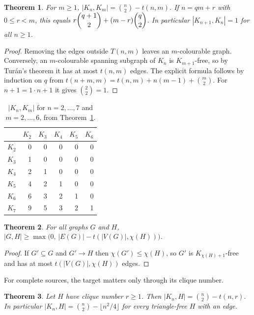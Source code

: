 \documentclass{article}
\newtheorem{theorem}{Theorem}[section]
\theoremstyle{definition}
\begin{document}
\begin{theorem}
\label{thm:KnKm}
For $m\ge1$, $\displaystyle|K_n,K_m| = \binom{n}{2} - t(n,m)$.
If $n=qm+r$ with $0\le r<m$, this equals
$r\dbinom{q+1}{2}+(m-r)\dbinom{q}{2}$.
In particular $|K_{n+1},K_n|=1$ for all $n\ge1$.
\end{theorem}

\begin{proof}
Removing the edges outside $T(n,m)$ leaves an $m$-colourable graph.  Conversely,
an $m$-colourable spanning subgraph of $K_n$ is $K_{m+1}$-free, so by Tur\'an's
theorem it has at most $t(n,m)$ edges.  The explicit formula follows by induction
on $q$ from $t(n+m,m)=t(n,m)+n(m-1)+\binom m2$.  For $n+1=1\cdot n+1$ it gives
$\binom22=1$.
\end{proof}

\begin{table}[ht]
\centering
\caption{$|K_n,K_m|$ for $n=2,\dots,7$ and $m=2,\dots,6$, from Theorem~\ref{thm:KnKm}.}
\label{tab:KnKm}
\begin{tabular}{c|rrrrr}
\toprule
       & $K_2$ & $K_3$ & $K_4$ & $K_5$ & $K_6$ \\
\midrule
$K_2$  & 0 & 0 & 0 & 0 & 0 \\
$K_3$  & 1 & 0 & 0 & 0 & 0 \\
$K_4$  & 2 & 1 & 0 & 0 & 0 \\
$K_5$  & 4 & 2 & 1 & 0 & 0 \\
$K_6$  & 6 & 3 & 2 & 1 & 0 \\
$K_7$  & 9 & 5 & 3 & 2 & 1 \\
\bottomrule
\end{tabular}
\end{table}

\begin{theorem}
\label{thm:lower_bound}
For all graphs $G$ and $H$,
$|G,H|\ge \max\bigl(0,\,|E(G)|-t(|V(G)|,\chi(H))\bigr)$.
\end{theorem}

\begin{proof}
If $G'\subseteq G$ and $G'\to H$ then $\chi(G')\le\chi(H)$, so $G'$ is
$K_{\chi(H)+1}$-free and has at most $t(|V(G)|,\chi(H))$ edges.
\end{proof}

For complete sources, the target matters only through its clique number.

\begin{theorem}
\label{thm:Kn_clique}
Let $H$ have clique number $r\ge1$.  Then $|K_n,H|=\binom n2-t(n,r)$.  In
particular $|K_n,H|=\binom n2-\lfloor n^2/4\rfloor$ for every triangle-free $H$
with an edge.
\end{theorem}
\end{document}
